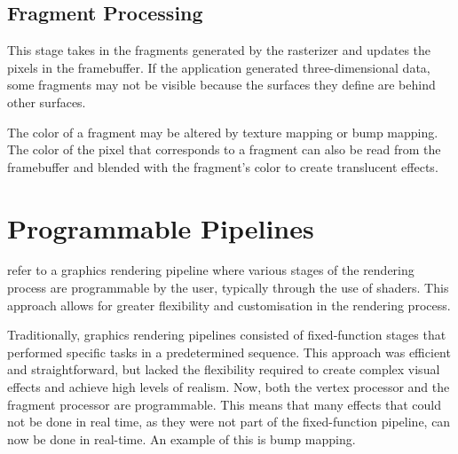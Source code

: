 \documentclass[../COS3712_Notes.tex]{subfiles}
\begin{document}
      \subsection{Fragment Processing}
        This stage takes in the fragments generated by the rasterizer
        and updates the pixels in the framebuffer.
        If the application generated three-dimensional data,
        some fragments may not be visible
        because the surfaces they define are behind other surfaces.

        The color of a fragment may be altered by texture mapping or bump mapping.
        The color of the pixel that corresponds to a fragment
        can also be read from the framebuffer
        and blended with the fragment's color
        to create translucent effects.

    \section{Programmable Pipelines}
       refer to a graphics rendering pipeline where various stages
      of the rendering process are programmable by the user, typically through the use of shaders.
      This approach allows for greater flexibility and customisation in the rendering process.

      Traditionally, graphics rendering pipelines consisted of fixed-function stages
      that performed specific tasks in a predetermined sequence.
      This approach was efficient and straightforward, but lacked the flexibility required
      to create complex visual effects and achieve high levels of realism.
      Now, both the vertex processor and the fragment processor are
      programmable.
      This means that many effects that could not be done in real time,
      as they were not part of the fixed-function pipeline,
      can now be done in real-time.
      An example of this is bump mapping.
\end{document}
